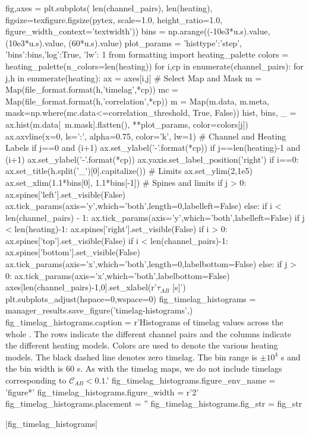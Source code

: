 \begin{pycode}
fig,axes = plt.subplots(
    len(channel_pairs), len(heating),
    figsize=texfigure.figsize(pytex, scale=1.0, height_ratio=1.0,
                                figure_width_context='textwidth'))
bins = np.arange((-10e3*u.s).value, (10e3*u.s).value, (60*u.s).value)
plot_params = {'histtype':'step', 'bins':bins,'log':True,
                'lw': 1}
from formatting import heating_palette
colors = heating_palette(n_colors=len(heating))
for i,cp in enumerate(channel_pairs):
    for j,h in enumerate(heating):
        ax = axes[i,j]
        # Select Map and Mask
        m = Map(file_format.format(h,'timelag',*cp))
        mc = Map(file_format.format(h,'correlation',*cp))
        m = Map(m.data, m.meta, mask=np.where(mc.data<=correlation_threshold, True, False))
        hist, bins, _ = ax.hist(m.data[~m.mask].flatten(), **plot_params, color=colors[j])
        ax.axvline(x=0, ls=':', alpha=0.75, color='k', lw=1)
        # Channel and Heating Labels
        if j==0 and (i+1)%
            ax.set_ylabel('{}-{}'.format(*cp))
        if j==len(heating)-1 and (i+1)%
            ax.set_ylabel('{}-{}'.format(*cp))
            ax.yaxis.set_label_position('right')
        if i==0:
            ax.set_title(h.split('_')[0].capitalize())
        # Limits
        ax.set_ylim(2,1e5)
        ax.set_xlim(1.1*bins[0], 1.1*bins[-1])
        # Spines and limits
        if j > 0:
            ax.spines['left'].set_visible(False)
            ax.tick_params(axis='y',which='both',length=0,labelleft=False)
        else:
            if i < len(channel_pairs) - 1:
                ax.tick_params(axis='y',which='both',labelleft=False)
        if j < len(heating)-1:
            ax.spines['right'].set_visible(False)
        if i > 0:
            ax.spines['top'].set_visible(False)
        if i < len(channel_pairs)-1:
            ax.spines['bottom'].set_visible(False)
            ax.tick_params(axis='x',which='both',length=0,labelbottom=False)
        else:
            if j > 0:
                ax.tick_params(axis='x',which='both',labelbottom=False)
axes[len(channel_pairs)-1,0].set_xlabel(r'$\tau_{AB}$ [s]')
plt.subplots_adjust(hspace=0,wspace=0)
fig_timelag_histograms = manager_results.save_figure('timelag-histograms',)
fig_timelag_histograms.caption = r'Histograms of timelag values across the whole \AR{}. The rows indicate the different channel pairs and the columns indicate the different heating models. Colors are used to denote the various heating models. The black dashed line denotes zero timelag. The bin range is $\pm10^4$ s and the bin width is 60 s. As with the timelag maps, we do not include timelags corresponding to $\mathcal{C}_{AB}<0.1$.'
fig_timelag_histograms.figure_env_name = 'figure*'
fig_timelag_histograms.figure_width = r'2\columnwidth'
fig_timelag_histograms.placement = ''
fig_timelag_histograms.fig_str = fig_str
\end{pycode}
|fig_timelag_histograms|

